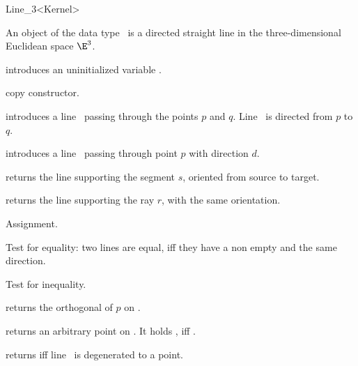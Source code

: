 \begin{ccRefClass} {Line_3<Kernel>}

\ccDefinition
An object  of the data type \ccRefName\ is a directed
straight line in the three-dimensional Euclidean space $\E^3$.

\ccCreation
{}

\ccHidden {}
             {introduces an uninitialized variable \ccVar.}

\ccHidden {}
 	    {copy constructor.}

            {introduces a line \ccVar\ passing through the points $p$ and $q$. 
             Line \ccVar\ is directed from $p$ to $q$.}


            {introduces a line \ccVar\ passing through point $p$ with 
             direction $d$.}

            {returns the line supporting the segment $s$,
	    oriented from source to target.}

            {returns the line supporting the ray $r$, with the
	    same orientation.}

\ccOperations
{}

\ccHidden {}
        {Assignment.}

       {Test for equality: two lines are equal, iff they have a non 
        empty  and the same direction.}

       {Test for inequality.}

       {returns the orthogonal  of $p$ on \ccVar.}

       {returns an arbitrary point on \ccVar. It holds 
        , iff .}

\ccPredicates

       {returns  iff line \ccVar\ is degenerated to a point.}


\end{ccRefClass}
